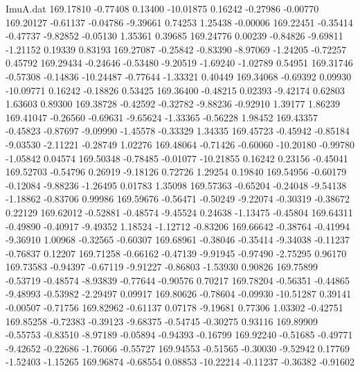 \begin{filecontents}{ImuA.dat}
 169.17810   -0.77408    0.13400  -10.01875    0.16242   -0.27986   -0.00770
 169.20127   -0.61137   -0.04786   -9.39661    0.74253    1.25438   -0.00006
 169.22451   -0.35414   -0.47737   -9.82852   -0.05130    1.35361    0.39685
 169.24776    0.00239   -0.84826   -9.69811   -1.21152    0.19339    0.83193
 169.27087   -0.25842   -0.83390   -8.97069   -1.24205   -0.72257    0.45792
 169.29434   -0.24646   -0.53480   -9.20519   -1.69240   -1.02789    0.54951
 169.31746   -0.57308   -0.14836  -10.24487   -0.77644   -1.33321    0.40449
 169.34068   -0.69392    0.09930  -10.09771    0.16242   -0.18826    0.53425
 169.36400   -0.48215    0.02393   -9.42174    0.62803    1.63603    0.89300
 169.38728   -0.42592   -0.32782   -9.88236   -0.92910    1.39177    1.86239
 169.41047   -0.26560   -0.69631   -9.65624   -1.33365   -0.56228    1.98452
 169.43357   -0.45823   -0.87697   -9.09990   -1.45578   -0.33329    1.34335
 169.45723   -0.45942   -0.85184   -9.03530   -2.11221   -0.28749    1.02276
 169.48064   -0.71426   -0.60060  -10.20180   -0.99780   -1.05842    0.04574
 169.50348   -0.78485   -0.01077  -10.21855    0.16242    0.23156   -0.45041
 169.52703   -0.54796    0.26919   -9.18126    0.72726    1.29254    0.19840
 169.54956   -0.60179   -0.12084   -9.88236   -1.26495    0.01783    1.35098
 169.57363   -0.65204   -0.24048   -9.54138   -1.18862   -0.83706    0.99986
 169.59676   -0.56471   -0.50249   -9.22074   -0.30319   -0.38672    0.22129
 169.62012   -0.52881   -0.48574   -9.45524    0.24638   -1.13475   -0.45804
 169.64311   -0.49890   -0.40917   -9.49352    1.18524   -1.12712   -0.83206
 169.66642   -0.38764   -0.41994   -9.36910    1.00968   -0.32565   -0.60307
 169.68961   -0.38046   -0.35414   -9.34038   -0.11237   -0.76837    0.12207
 169.71258   -0.66162   -0.47139   -9.91945   -0.97490   -2.75295    0.96170
 169.73583   -0.94397   -0.67119   -9.91227   -0.86803   -1.53930    0.90826
 169.75899   -0.53719   -0.48574   -8.93839   -0.77644   -0.90576    0.70217
 169.78204   -0.56351   -0.44865   -9.48993   -0.53982   -2.29497    0.09917
 169.80626   -0.78604   -0.09930  -10.51287    0.39141   -0.00507   -0.71756
 169.82962   -0.61137    0.07178   -9.19681    0.77306    1.03302   -0.42751
 169.85258   -0.72383   -0.39123   -9.68375   -0.54745   -0.30275    0.93116
 169.89909   -0.55753   -0.83510   -8.97189   -0.05894   -0.94393   -0.16799
 169.92240   -0.51685   -0.49771   -9.42652   -0.22686   -1.76066   -0.55727
 169.94553   -0.51565   -0.30030   -9.52942    0.17769   -1.52403   -1.15265
 169.96874   -0.68554    0.08853  -10.22214   -0.11237   -0.36382   -0.91602

\end{filecontents}
